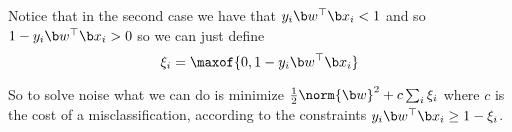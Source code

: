 Notice that in the second case we have that $y_i\b w^\top\b x_i<1$ and so $1-y_i\b w^\top\b x_i>0$ so we can just define
$$ \xi_i = \maxof{0,1-y_i\b w^\top\b x_i} $$

So to solve noise what we can do is minimize $\frac12\norm{\b w}^2+c\sum_i\xi_i$ where $c$ is the cost of a misclassification, according to the constraints $y_i\b w^\top\b x_i\geq1-\xi_i$.

